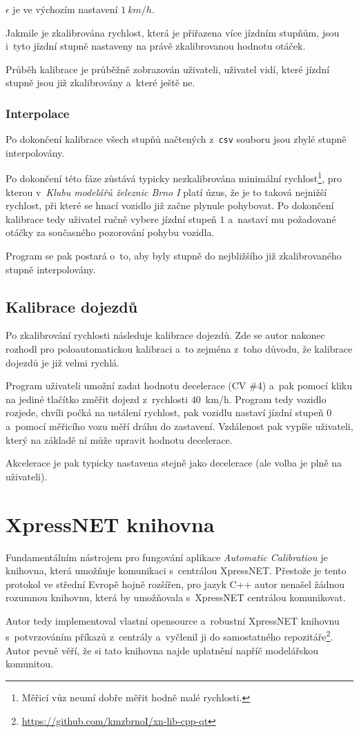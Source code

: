 $\epsilon$ je ve výchozím nastavení $1\ km/h$.

Jakmile je zkalibrována rychlost, která je přiřazena více jízdním stupňům,
jsou i~tyto jízdní stupně nastaveny na právě zkalibrovanou hodnotu otáček.

Průběh kalibrace je průběžně zobrazován uživateli, uživatel vidí, které
jízdní stupně jsou již zkalibrovány a~které ještě ne.

\subsubsection{Interpolace}

Po dokončení kalibrace všech stupňů načtených z~\texttt{csv} souboru jsou zbylé
stupně interpolovány.

Po dokončení této fáze zůstává typicky nezkalibrována minimální
rychlost\footnote{Měřicí vůz neumí dobře měřit hodně malé rychlosti.}, pro kterou
v~\textit{Klubu modelářů železnic Brno I} platí úzus, že je to taková nejnižší
rychlost, při které se hnací vozidlo již začne plynule pohybovat. Po dokončení
kalibrace tedy uživatel ručně vybere jízdní stupeň $1$ a~nastaví mu
požadované otáčky za současného pozorování pohybu vozidla.

Program se pak postará o~to, aby byly stupně do nejbližšího již zkalibrovaného
stupně interpolovány.

\subsection{Kalibrace dojezdů}

Po zkalibrování rychlosti následuje kalibrace dojezdů. Zde se autor nakonec
rozhodl pro poloautomatickou kalibraci a~to zejména z~toho důvodu, že kalibrace
dojezdů je již velmi rychlá.

Program uživateli umožní zadat hodnotu decelerace (CV \#4) a~pak pomocí kliku
na jediné tlačítko změřit dojezd z~rychlosti $40$~km/h. Program tedy vozidlo
rozjede, chvíli počká na ustálení rychlost, pak vozidlu nastaví jízdní stupeň
$0$ a~pomocí měřicího vozu měří dráhu do zastavení. Vzdálenost pak vypíše
uživateli, který na základě ní může upravit hodnotu decelerace.

Akcelerace je pak typicky nastavena stejně jako decelerace (ale volba je plně
na uživateli).

\section{XpressNET knihovna}
\label{sec:xn-lib}

Fundamentálním nástrojem pro fungování aplikace \textit{Automatic Calibration}
je knihovna, která umožňuje komunikaci s~centrálou XpressNET. Přestože je tento
protokol ve střední Evropě hojně rozšířen, pro jazyk C++ autor nenašel žádnou
rozumnou knihovnu, která by umožňovala s~XpressNET centrálou komunikovat.

Autor tedy implementoval vlastní opensource a~robustní XpressNET knihovnu
s~potvrzováním příkazů z~centrály a~vyčlenil ji do samostatného
repozitáře\footnote{\url{https://github.com/kmzbrnoI/xn-lib-cpp-qt}}. Autor
pevně věří, že si tato knihovna najde uplatnění napříč modelářskou komunitou.

